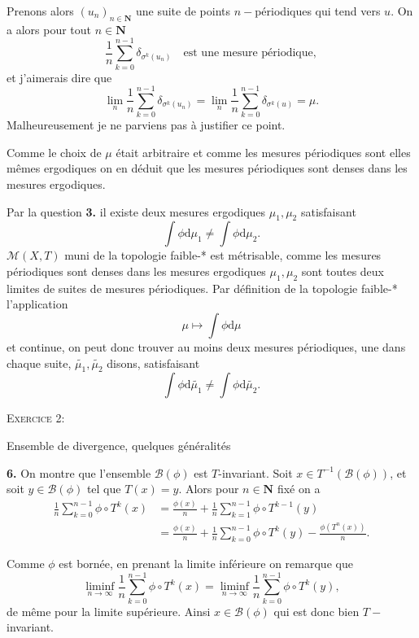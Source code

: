 \documentclass[12pt]{article}
\newenvironment{ex}[1]
{\begin{mdframed}[linewidth=0.6pt]
        \textsc{Exercice #1:}

}
    {\end{mdframed}}
\newcommand{\N}{\mathbf{N}}
\newcommand{\de}{\mathrm{d}}
\begin{document}
Prenons alors $(u_{n})_{n\in\N}$ une suite de points $n-$périodiques qui tend vers $u$. On a alors pour tout $n \in \N$ \[
        \frac{1}{n}\sum_{k=0}^{n-1}\delta_{\sigma^{k}(u_{n})} \quad \text{est une mesure périodique}
,\] et j'aimerais dire que \[
\lim_{n}\frac{1}{n}\sum_{k=0}^{n-1}\delta_{\sigma^{k}(u_{n})} =  \lim_{n}\frac{1}{n}\sum_{k=0}^{n-1}\delta_{\sigma^{k}(u)} = \mu 
.\] Malheureusement je ne parviens pas à justifier ce point.

Comme le choix de $\mu$ était arbitraire et comme les mesures périodiques sont elles mêmes ergodiques on en déduit que les mesures périodiques sont denses dans les mesures ergodiques. 


Par la question \textbf{3.} il existe deux mesures ergodiques $\mu_1, \mu_2$ satisfaisant \[
\int\phi\de\mu_1 \neq \int\phi\de\mu_2
.\] $\mathcal{M}(X,T)$ muni de la topologie faible-* est métrisable, comme les mesures périodiques sont denses dans les mesures ergodiques $\mu_1, \mu_2$ sont toutes deux limites de suites de mesures périodiques. Par définition de la topologie faible-* l'application \[
\mu \longmapsto \int\phi\de\mu
\] et continue, on peut donc trouver au moins deux mesures périodiques, une dans chaque suite, $\tilde{\mu_1}, \tilde{\mu_2}$ disons, satisfaisant \[
\int\phi\de\tilde{\mu_1} \neq \int\phi\de\tilde{\mu_2}
.\]  

\begin{ex}{2}
       Ensemble de divergence, quelques généralités 
\end{ex}

\textbf{6.} On montre que l'ensemble $\mathcal{B}(\phi)$ est $T$-invariant. Soit $x \in T^{-1}(\mathcal{B}(\phi))$, et soit $y \in \mathcal{B}(\phi)$ tel que $T(x) = y$. Alors pour $n \in \N$ fixé on a 
\begin{align*}
        \frac{1}{n}\sum_{k=0}^{n-1} \phi\circ T^{k}(x) &= \frac{\phi(x)}{n} + \frac{1}{n}\sum_{k=1}^{n-1} \phi\circ T^{k-1}(y) \\
                                                       &=\frac{\phi(x)}{n} + \frac{1}{n}\sum_{k=0}^{n-1} \phi\circ T^{k}(y) - \frac{\phi(T^{n}(x))}{n}
.\end{align*}

Comme $\phi$ est bornée, en prenant la limite inférieure on remarque que \[
        \liminf_{n\to \infty} \frac{1}{n}\sum_{k=0}^{n-1} \phi\circ T^{k}(x) = \liminf_{n\to \infty} \frac{1}{n}\sum_{k=0}^{n-1} \phi\circ T^{k}(y)
,\] de même pour la limite supérieure. Ainsi $x \in \mathcal{B}(\phi)$ qui est donc bien $T-$invariant. 
\end{document}
